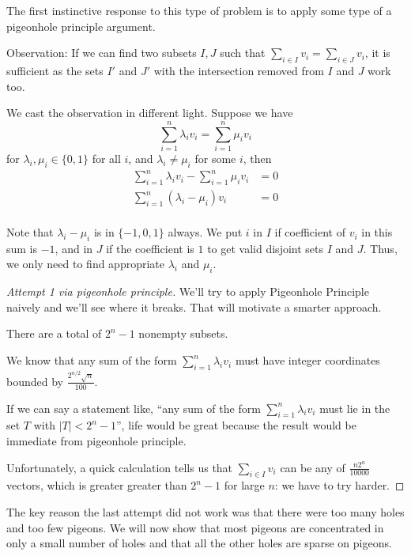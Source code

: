 \documentclass[oneside,11pt]{scrbook}
\theoremstyle{plain}
\theoremstyle{definition}
\theoremstyle{remark}
\begin{document}
The first instinctive response to this type of problem is to apply some type of a pigeonhole
principle argument.

\textsf{Observation:}
If we can find two subsets $I,J$ such that $\sum_{i\in I}v_i=\sum_{i\in J}v_i$, it
is sufficient as the sets $I'$ and $J'$ with the intersection removed from $I$ and $J$
work too.

We cast the observation in different light. Suppose we have
\[
\sum_{i=1}^n \lambda_i v_i = \sum_{i=1}^n \mu_i v_i
\]
for $\lambda_i,\mu_i\in\{0,1\}$ for all $i$, and $\lambda_i\neq\mu_i$ for some $i$,
then
\begin{align*}
\sum_{i=1}^n \lambda_i v_i - \sum_{i=1}^n \mu_i v_i &= 0\\
\sum_{i=1}^n (\lambda_i-\mu_i)v_i &= 0\\
\end{align*}

Note that $\lambda_i-\mu_i$ is in $\{-1,0,1\}$ always.
We put $i$ in $I$ if coefficient of $v_i$ in this sum is $-1$,
and in $J$ if the coefficient is $1$ to get valid disjoint sets
$I$ and $J$. Thus, we only need to find appropriate $\lambda_i$ and
$\mu_i$.

\begin{proof}[\textsf{Attempt 1 via pigeonhole principle}]
\renewcommand{\qedsymbol}{}

We'll try to apply Pigeonhole Principle naively and we'll see where it breaks.
That will motivate a smarter approach.

There are a total of $2^n-1$ nonempty subsets.

We know that any sum of the form $\sum_{i=1}^n\lambda_iv_i$ must have integer coordinates
bounded by $\frac{2^{n/2}\sqrt{n}}{100}$.

If we can say a statement like, ``any sum of
the form $\sum_{i=1}^n\lambda_iv_i$ must lie in the set $T$ with $|T|<2^n-1$'',
life would be great because the result would be immediate
from pigeonhole principle.

Unfortunately, a quick calculation tells us that $\sum_{i\in I}v_i$
can be any of $\frac{n2^n}{10000}$ vectors, which is greater
greater than $2^n-1$ for large $n$: we have to try harder.

\end{proof}

The key reason the last attempt did not work was that there were too many
holes and too few pigeons. We will now show that most pigeons are concentrated in only
a small number of holes and that all the other holes are sparse on pigeons.
\end{document}

